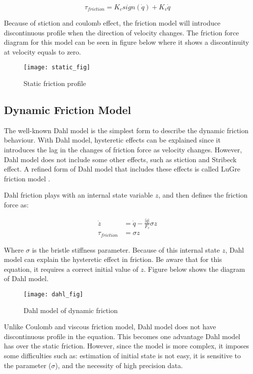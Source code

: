\begin{equation}
  \tau_{friction} = K_{c} sign\left(\dot{q}\right) + K_{v} \dot{q}
\end{equation}

Because of stiction and coulomb effect, the friction model will introduce discontinuous profile when the direction of velocity changes. The friction force diagram for this model can be seen in figure below where it shows a discontinuity at velocity equals to zero.

\begin{figure}[H]
    \centering
    \texttt{[image: static\_fig]}
    \caption{Static friction profile}
    \label{fig:static fric}
\end{figure}


\subsection{Dynamic Friction Model}
The well-known Dahl model is the simplest form to describe the dynamic friction behaviour. With Dahl model, hysteretic effects can be explained since it introduces the lag in the changes of friction force as velocity changes. However, Dahl model does not include some other effects, such as stiction and Stribeck effect. A refined form of Dahl model that includes these effects is called LuGre friction model \cite{Bona05}.

Dahl friction plays with an internal state variable $z$, and then defines the friction force as:

\begin{align}
  \dot{z} &= \dot{q} - \frac{\left|\dot{q}\right|}{F_{c}} \sigma z \\
  \tau_{friction} &= \sigma z
\end{align}

Where $\sigma$ is the bristle stiffness parameter. Because of this internal state $z$, Dahl model can explain the hysteretic effect in friction. Be aware that for this equation, it requires a correct initial value of $z$. Figure below shows the diagram of Dahl model.  

\begin{figure}[H]
    \centering
    \texttt{[image: dahl\_fig]}
    \caption{Dahl model of dynamic friction}
    \label{fig:Dahl fric}
\end{figure}

Unlike Coulomb and viscous friction model, Dahl model does not have discontinuous profile in the equation. This becomes one advantage Dahl model has over the static friction. However, since the model is more complex, it imposes some difficulties such as: estimation of initial state is not easy, it is sensitive to the parameter ($\sigma$), and the necessity of high precision data. 
